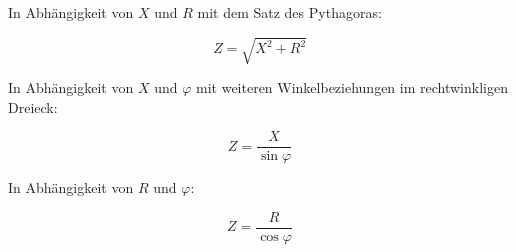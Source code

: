 In Abhängigkeit von $X$ und $R$ mit dem Satz des Pythagoras:

\begin{equation}	\label{eq:ImepdanzXR}
	Z = \sqrt{X^2 + R^2}
\end{equation}


\noindent In Abhängigkeit von $X$ und $\varphi$ mit weiteren Winkelbeziehungen im rechtwinkligen Dreieck:

\begin{equation}	\label{eq:ImepdanzXphi}
	Z = \frac{X}{\sin\varphi}
\end{equation}


\noindent In Abhängigkeit von $R$ und $\varphi$:

\begin{equation}	\label{eq:ImepdanzRphi}
	Z = \frac{R}{\cos\varphi}
\end{equation}